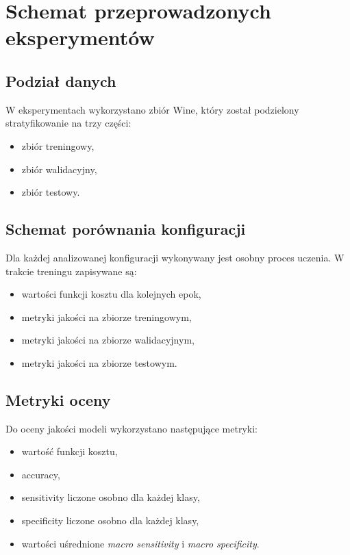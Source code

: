 \section{Schemat przeprowadzonych eksperymentów}

\subsection{Podział danych}

W eksperymentach wykorzystano zbiór Wine, który został podzielony
stratyfikowanie na trzy części:
\begin{itemize}
    \item zbiór treningowy,
    \item zbiór walidacyjny,
    \item zbiór testowy.
\end{itemize}

\begin{table}[H]
    \centering
    
    \caption{Schemat podziału danych wykorzystywany w etapie trzecim}
    \label{tab:data_split_summary}
\end{table}

\subsection{Schemat porównania konfiguracji}

Dla każdej analizowanej konfiguracji wykonywany jest osobny proces uczenia.
W trakcie treningu zapisywane są:
\begin{itemize}
    \item wartości funkcji kosztu dla kolejnych epok,
    \item metryki jakości na zbiorze treningowym,
    \item metryki jakości na zbiorze walidacyjnym,
    \item metryki jakości na zbiorze testowym.
\end{itemize}

\subsection{Metryki oceny}

Do oceny jakości modeli wykorzystano następujące metryki:
\begin{itemize}
    \item wartość funkcji kosztu,
    \item accuracy,
    \item sensitivity liczone osobno dla każdej klasy,
    \item specificity liczone osobno dla każdej klasy,
    \item wartości uśrednione \textit{macro sensitivity} i
    \textit{macro specificity}.
\end{itemize}


